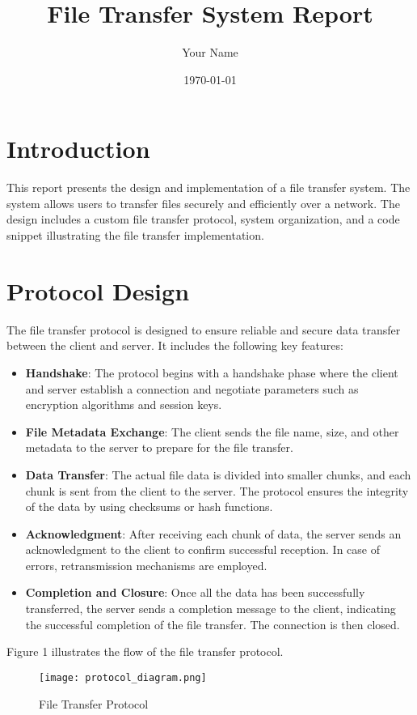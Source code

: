 \documentclass{article}
\title{File Transfer System Report}
\author{Your Name}
\date{\today}
\begin{document}
\maketitle

\section{Introduction}
This report presents the design and implementation of a file transfer system. The system allows users to transfer files securely and efficiently over a network. The design includes a custom file transfer protocol, system organization, and a code snippet illustrating the file transfer implementation.

\section{Protocol Design}
The file transfer protocol is designed to ensure reliable and secure data transfer between the client and server. It includes the following key features:

\begin{itemize}
  \item \textbf{Handshake}: The protocol begins with a handshake phase where the client and server establish a connection and negotiate parameters such as encryption algorithms and session keys.
  \item \textbf{File Metadata Exchange}: The client sends the file name, size, and other metadata to the server to prepare for the file transfer.
  \item \textbf{Data Transfer}: The actual file data is divided into smaller chunks, and each chunk is sent from the client to the server. The protocol ensures the integrity of the data by using checksums or hash functions.
  \item \textbf{Acknowledgment}: After receiving each chunk of data, the server sends an acknowledgment to the client to confirm successful reception. In case of errors, retransmission mechanisms are employed.
  \item \textbf{Completion and Closure}: Once all the data has been successfully transferred, the server sends a completion message to the client, indicating the successful completion of the file transfer. The connection is then closed.
\end{itemize}

Figure 1 illustrates the flow of the file transfer protocol.

\begin{figure}[h]
  \centering
  \texttt{[image: protocol\_diagram.png]}
  \caption{File Transfer Protocol}
  \label{fig:protocol}
\end{figure}
\end{document}
